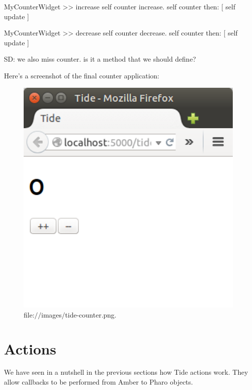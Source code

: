 \documentclass[a4paper,10pt,twoside]{book}
\begin{document}
\begin{code}{}
MyCounterWidget >> increase
	self counter increase.
	self counter then: [ self update ]

MyCounterWidget >> decrease
	self counter decrease.
	self counter then: [ self update ]
\end{code}


SD: we also miss counter. is it a method that we should define?

Here's a screenshot of the final counter application:


\begin{figure}

\begin{center}
\includegraphics[width=1.0\textwidth]{images/tide-counter.png}\caption{file:$/$$/$images$/$tide-counter.png.\label{images/tide-counter.png}}\end{center}
\end{figure}

\chapter{ Actions}
We have seen in a nutshell in the previous sections how Tide actions work. They allow callbacks
to be performed from Amber to Pharo objects.
\end{document}
